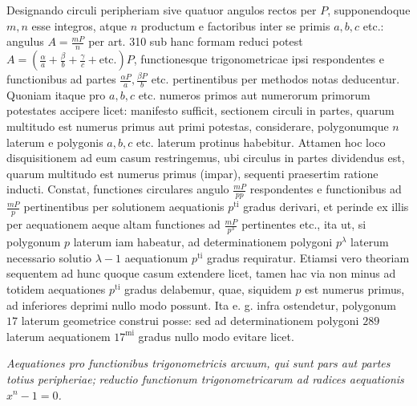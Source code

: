 Designando circuli peripheriam sive quatuor angulos rectos per \(P\), supponendoque \(m,\allowbreak n\) esse integros, atque \(n\) productum e factoribus inter se primis \(a,\allowbreak b,\allowbreak c\) etc.: angulus \(A=\frac{mP}{n}\) per art. 310 sub hanc formam reduci potest \(A=(\frac\alpha a+\frac\beta b+\frac\gamma c+\mathrm{etc.})P\), functionesque trigonometricae ipsi respondentes e functionibus ad partes \(\frac{\alpha P}a,\allowbreak \frac{\beta P}b\) etc. pertinentibus per methodos notas deducentur. Quoniam itaque pro \(a,\allowbreak b,\allowbreak c\) etc. numeros primos aut numerorum primorum potestates accipere licet: manifesto sufficit, sectionem circuli in partes, quarum multitudo est numerus primus aut primi potestas, considerare, polygonumque \(n\) laterum e polygonis \(a,\allowbreak b,\allowbreak c\) etc. laterum protinus habebitur. Attamen hoc loco disquisitionem ad eum casum restringemus, ubi circulus in partes dividendus est, quarum multitudo est numerus primus (impar), sequenti praesertim ratione inducti. Constat, functiones circulares angulo \(\frac{mP}{pp}\) respondentes e functionibus ad \(\frac{mP}p\) pertinentibus per solutionem aequationis \(p^{\mathrm{ti}}\) gradus derivari, et perinde ex illis per aequationem aeque altam functiones ad \(\frac{mP}{p^3}\) pertinentes etc., ita ut, si polygonum \(p\) laterum iam habeatur, ad determinationem polygoni \(p^\lambda\) laterum necessario solutio \(\lambda-1\) aequationum \(p^{\mathrm{ti}}\) gradus requiratur. Etiamsi vero theoriam sequentem ad hunc quoque casum extendere licet, tamen hac via non minus ad totidem aequationes \(p^{\mathrm{ti}}\) gradus delabemur, quae, siquidem \(p\) est numerus primus, ad inferiores deprimi nullo modo possunt. Ita e. g. infra ostendetur, polygonum \(17\) laterum geometrice construi posse: sed ad determinationem polygoni \(289\) laterum aequationem \(17^{\mathrm{mi}}\) gradus nullo modo evitare licet.

\begin{center}\textit{Aequationes pro functionibus trigonometricis arcuum, qui sunt pars aut partes totius peripheriae;} \textit{reductio functionum trigonometricarum ad radices aequationis \(x^n-1=0\).}\end{center}


